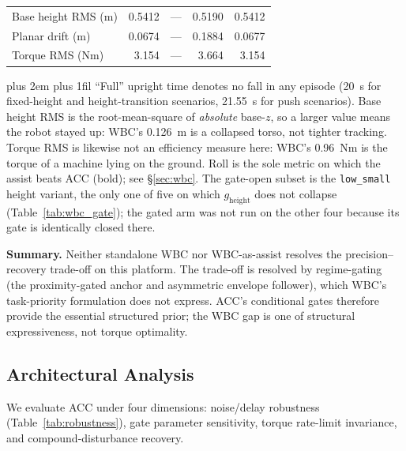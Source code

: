 \documentclass[conference]{IEEEtran}
\newcommand{\tabnote}{\par\leftskip=0pt\rightskip=0pt plus 2em%
  \parfillskip=0pt plus 1fil\relax}
\begin{document}
\begin{table}[t]
\begin{tabular}{@{}>{\raggedright\arraybackslash}p{}rrrr@{}}
Base height RMS (m)        & 0.5412 & --- & 0.5190 & 0.5412 \\
Planar drift (m)           & 0.0674 & --- & 0.1884 & 0.0677 \\
Torque RMS (Nm)            & 3.154  & --- & 3.664  & 3.154 \\
\bottomrule
\end{tabular}
\vspace{4pt}\tabnote\noindent\footnotesize
``Full'' upright time denotes no fall in any episode (\SI{20}{s} for fixed-height and height-transition scenarios, \SI{21.55}{s} for push scenarios).
Base height RMS is the root-mean-square of \emph{absolute} base-$z$, so a larger value means the robot stayed up: WBC's \SI{0.126}{m} is a collapsed torso, not tighter tracking.
Torque RMS is likewise not an efficiency measure here: WBC's \SI{0.96}{Nm} is the torque of a machine lying on the ground.
Roll is the sole metric on which the assist beats ACC (bold); see \S\ref{sec:wbc}.
The gate-open subset is the \texttt{low\_small} height variant, the only one of five on which $g_{\text{height}}$ does not collapse (Table~\ref{tab:wbc_gate}); the gated arm was not run on the other four because its gate is identically closed there.
\end{table}

\medskip\noindent\textbf{Summary.}
Neither standalone WBC nor WBC-as-assist resolves the precision--recovery trade-off on this platform.
The trade-off is resolved by regime-gating (the proximity-gated anchor and asymmetric envelope follower), which WBC's task-priority formulation does not express.
ACC's conditional gates therefore provide the essential structured prior; the WBC gap is one of structural expressiveness, not torque optimality.



\subsection{Architectural Analysis}
\label{sec:analysis}

We evaluate ACC under four dimensions: noise/delay robustness (Table~\ref{tab:robustness}), gate parameter sensitivity, torque rate-limit invariance, and compound-disturbance recovery.
\end{document}

